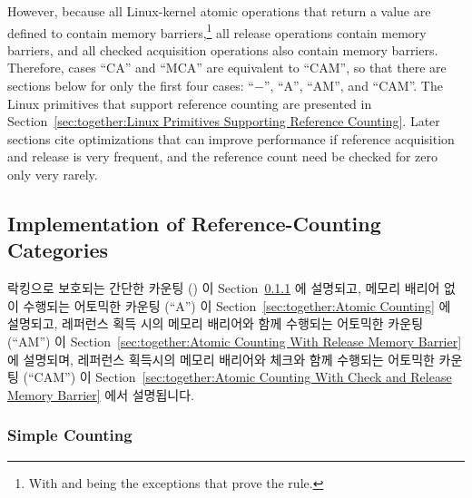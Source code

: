 However, because all Linux-kernel atomic operations that return a
value are defined to contain memory barriers,\footnote{
	With  and  being the
	exceptions that prove the rule.}
all release operations
contain memory barriers, and all checked acquisition operations also
contain memory barriers.
Therefore, cases ``CA'' and ``MCA'' are equivalent to ``CAM'', so that
there are sections below for only the first four cases:
``$-$'', ``A'', ``AM'', and ``CAM''.
The Linux primitives that support reference counting are presented in
Section~\ref{sec:together:Linux Primitives Supporting Reference Counting}.
Later sections cite optimizations that can improve performance
if reference acquisition and release is very frequent, and the
reference count need be checked for zero only very rarely.
\fi

\subsection{Implementation of Reference-Counting Categories}
\label{sec:together:Implementation of Reference-Counting Categories}

락킹으로 보호되는 간단한 카운팅 () 이
Section~\ref{sec:together:Simple Counting} 에 설명되고,
메모리 배리어 없이 수행되는 어토믹한 카운팅 (``A'') 이
Section~\ref{sec:together:Atomic Counting} 에 설명되고,
레퍼런스 획득 시의 메모리 배리어와 함께 수행되는 어토믹한 카운팅 (``AM'') 이
Section~\ref{sec:together:Atomic Counting With Release Memory Barrier} 에 설명되며,
레퍼런스 획득시의 메모리 배리어와 체크와 함께 수행되는 어토믹한 카운팅 (``CAM'') 이
Section~\ref{sec:together:Atomic Counting With Check and Release Memory Barrier}
에서 설명됩니다.
\iffalse

Simple counting protected by locking (``$-$'') is described in
Section~\ref{sec:together:Simple Counting},
atomic counting with no memory barriers (``A'') is described in
Section~\ref{sec:together:Atomic Counting},
atomic counting with acquisition memory barrier (``AM'') is described in
Section~\ref{sec:together:Atomic Counting With Release Memory Barrier},
and
atomic counting with check and release memory barrier (``CAM'') is described in
Section~\ref{sec:together:Atomic Counting With Check and Release Memory Barrier}.
\fi

\subsubsection{Simple Counting}
\label{sec:together:Simple Counting}


